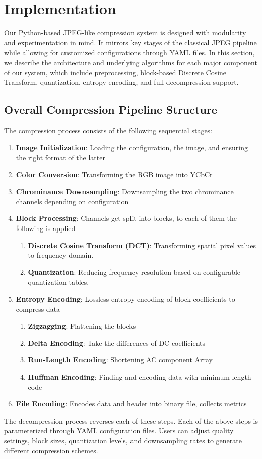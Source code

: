 \section{Implementation}
\label{sec:implementation}

Our Python-based JPEG-like compression system is designed with modularity and experimentation in mind. It mirrors key stages of the classical JPEG pipeline while allowing for customized configurations through YAML files. In this section, we describe the architecture and underlying algorithms for each major component of our system, which include preprocessing, block-based Discrete Cosine Transform, quantization, entropy encoding, and full decompression support.

\subsection{Overall Compression Pipeline Structure}
The compression process consists of the following sequential stages:
\begin{enumerate}
    \item \textbf{Image Initialization}: Loading the configuration, the image, and ensuring the right format of the latter
    \item \textbf{Color Conversion}: Transforming the RGB image into YCbCr
    \item \textbf{Chrominance Downsampling}: Downsampling the two chrominance channels depending on configuration
    \item \textbf{Block Processing}: Channels get split into blocks, to each of them the following is applied
    \begin{enumerate}
    	\item \textbf{Discrete Cosine Transform (DCT)}: Transforming spatial pixel values to frequency domain.
		\item \textbf{Quantization}: Reducing frequency resolution based on configurable quantization tables.
    \end{enumerate}
    \item \textbf{Entropy Encoding}: Lossless entropy-encoding of block coefficients to compress data
        \begin{enumerate}
    	\item \textbf{Zigzagging}: Flattening the blocks
    	\item \textbf{Delta Encoding}: Take the differences of DC coefficients
    	\item \textbf{Run-Length Encoding}: Shortening AC component Array 
    	\item \textbf{Huffman Encoding}: Finding and encoding data with minimum length code 
    \end{enumerate}
    \item \textbf{File Encoding}: Encodes data and header into binary file, collects metrics
\end{enumerate}
\noindent
The decompression process reverses each of these steps.
\noindent
Each of the above steps is parameterized through YAML configuration files. Users can adjust quality settings, block sizes, quantization levels, and downsampling rates to generate different compression schemes.

